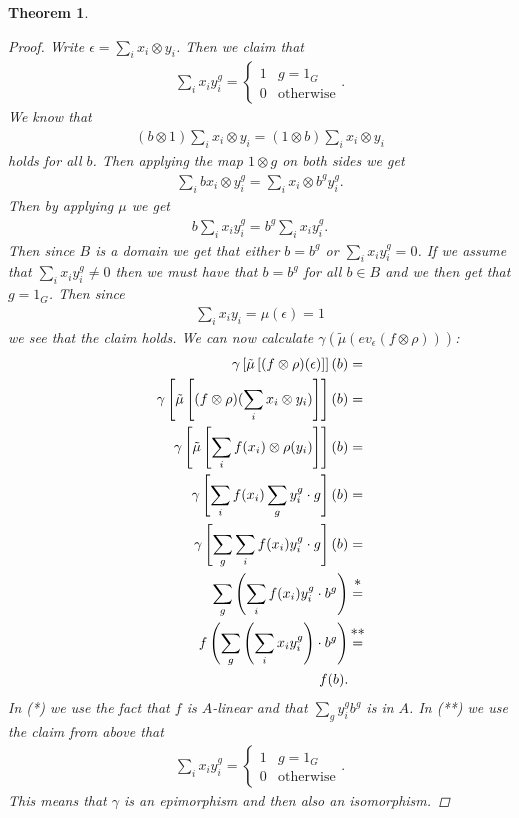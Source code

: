 \documentclass[11pt, a4paper, english]{article}
\newtheorem{theorem}{Theorem}[section]
\theoremstyle{definition}
\begin{document}
\begin{theorem}
\begin{proof}
Write $\epsilon = \sum\limits_i x_i \otimes y_i$. Then we claim that
\begin{align*}
\sum_i x_i y_i^g = \begin{cases}
1 & g = 1_G\\
0 & \text{otherwise}
\end{cases}.
\end{align*}
We know that
\begin{align*}
(b \otimes 1)\sum_i x_i \otimes y_i = (1 \otimes b)\sum_i x_i \otimes y_i
\end{align*}
holds for all $b$. Then applying the map $1 \otimes g$ on both sides we get
\begin{align*}
\sum_i bx_i \otimes y_i^g = \sum_i x_i \otimes b^gy_i^g.
\end{align*}
Then by applying $\mu$ we get
\begin{align*}
b\sum_i x_i y_i^g = b^g\sum_i x_i  y_i^g.
\end{align*}
Then since $B$ is a domain we get that either $b = b^g$ or $\sum_i x_i  y_i^g = 0$. If we assume that $\sum_i x_i  y_i^g \neq 0$ then we must have that $b = b^g$ for all $b \in B$ and we then get that $g = 1_G$. Then since
\begin{align*}
\sum_i x_i  y_i = \mu(\epsilon) = 1
\end{align*}
we see that the claim holds. We can now calculate $\gamma(\tilde{\mu}(ev_\epsilon(f \otimes \rho)))$:
\begin{align*}
\gamma \left[ \tilde{\mu} \left[ (f \otimes \rho)(\epsilon) \right] \right] (b) &=\\
\gamma \left[ \tilde{\mu} \left[ (f \otimes \rho)(\sum_i x_i \otimes y_i) \right] \right] (b) &=\\
\gamma \left[ \tilde{\mu} \left[ \sum_i f(x_i) \otimes \rho(y_i) \right] \right] (b) &=\\
\gamma \left[ \sum_i f(x_i) \sum_g y_i^g \cdot g \right] (b) &=\\
\gamma \left[ \sum_g \sum_i f(x_i) y_i^g \cdot g \right] (b) &=\\
\sum_g \left(\sum_i f(x_i) y_i^g \cdot b^g \right) &\stackrel{\mathclap{\normalfont\mbox{*}}}{=}\\
f \left( \sum_g \left(\sum_i x_i y_i^g \right) \cdot b^g \right) &\stackrel{\mathclap{\normalfont\mbox{**}}}{=}\\
f(b). &
\end{align*}
In (*) we use the fact that $f$ is $A$-linear and that $\sum_g y_i^g b^g$ is in $A$. In (**) we use the claim from above that
\begin{align*}
\sum_i x_i y_i^g = \begin{cases}
1 & g = 1_G\\
0 & \text{otherwise}
\end{cases}.
\end{align*}
This means that $\gamma$ is an epimorphism and then also an isomorphism.
\end{proof}
\end{theorem}
\end{document}
